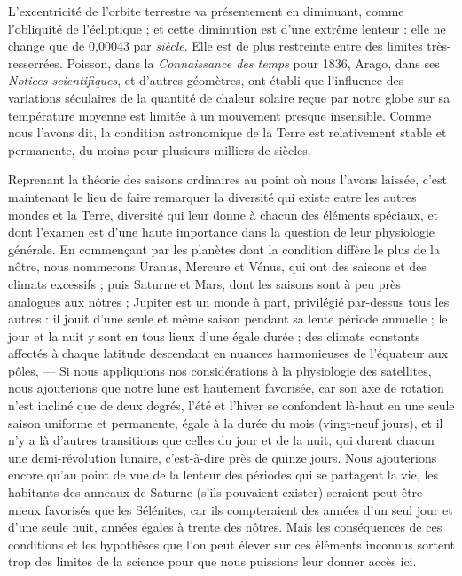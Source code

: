 \documentclass[a4paper, 11pt, oneside, landscape]{article}
\begin{document}
L'excentricité de l'orbite terrestre va présentement en diminuant, comme l'obliquité de l'écliptique ; et cette diminution est d'une extrême lenteur : elle ne change que de 0,00043 par \emph{siècle}. Elle est de plus restreinte entre des limites très-resserrées. Poisson, dans la \emph{Connaissance des temps} pour 1836, Arago, dans ses \emph{Notices scientifiques}, et d'autres géomètres, ont établi que l'influence des variations séculaires de la quantité de chaleur solaire reçue par notre globe sur sa température moyenne est limitée à un mouvement presque insensible. Comme nous l'avons dit, la condition astronomique de la Terre est relativement stable et permanente, du moins pour plusieurs milliers de siècles.

Reprenant la théorie des saisons ordinaires au point où nous l'avons laissée, c'est maintenant le lieu de faire remarquer la diversité qui existe entre les autres mondes et la Terre, diversité qui leur donne à chacun des éléments spéciaux, et dont l'examen est d'une haute importance dans la question de leur physiologie générale. En commençant par les planètes dont la condition diffère le plus de la nôtre, nous nommerons Uranus, Mercure et Vénus, qui ont des saisons et des climats excessifs ; puis Saturne et Mars, dont les saisons sont à peu près analogues aux nôtres ; Jupiter est un monde à part, privilégié par-dessus tous les autres : il jouit d'une seule et même saison pendant sa lente période annuelle ; le jour et la nuit y sont en tous lieux d'une égale durée ; des climats constants affectés à chaque latitude descendant en nuances harmonieuses de l'équateur aux pôles, --- Si nous appliquions nos considérations à la physiologie des satellites, nous ajouterions que notre lune est hautement favorisée, car son axe de rotation n'est incliné que de deux degrés, l'été et l'hiver se confondent là-haut en une seule saison uniforme et permanente, égale à la durée du mois (vingt-neuf jours), et il n'y a là d'autres transitions que celles du jour et de la nuit, qui durent chacun une demi-révolution lunaire, c'est-à-dire près de quinze jours. Nous ajouterions encore qu'au point de vue de la lenteur des périodes qui se partagent la vie, les habitants des anneaux de Saturne (s'ils pouvaient exister) seraient peut-être mieux favorisés que les Sélénites, car ils compteraient des années d'un seul jour et d'une seule nuit, années égales à trente des nôtres. Mais les conséquences de ces conditions et les hypothèses que l'on peut élever sur ces éléments inconnus sortent trop des limites de la science pour que nous puissions leur donner accès ici.
\end{document}
